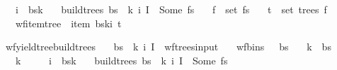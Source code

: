 \begin{isabellebody}
\ \ \ {\isachardoublequoteopen}i\ {\isacharless}{\kern0pt}\ {\isacharbar}{\kern0pt}bs{\isacharbang}{\kern0pt}k{\isacharbar}{\kern0pt}{\isachardoublequoteclose}\isanewline
\ \ \ {\isachardoublequoteopen}build{\isacharunderscore}{\kern0pt}trees{\isacharprime}{\kern0pt}\ bs\ {\isasymomega}\ k\ i\ I\ {\isacharequal}{\kern0pt}\ Some\ fs{\isachardoublequoteclose}\isanewline
\ \ \ {\isachardoublequoteopen}f\ {\isasymin}\ set\ fs{\isachardoublequoteclose}\isanewline
\ \ \ {\isachardoublequoteopen}t\ {\isasymin}\ set\ {\isacharparenleft}{\kern0pt}trees\ f{\isacharparenright}{\kern0pt}{\isachardoublequoteclose}\isanewline
\ \ \ {\isachardoublequoteopen}wf{\isacharunderscore}{\kern0pt}item{\isacharunderscore}{\kern0pt}tree\ {\isasymG}\ {\isacharparenleft}{\kern0pt}item\ {\isacharparenleft}{\kern0pt}bs{\isacharbang}{\kern0pt}k{\isacharbang}{\kern0pt}i{\isacharparenright}{\kern0pt}{\isacharparenright}{\kern0pt}\ t{\isachardoublequoteclose}%
\isadelimproof
%
\endisadelimproof
%
\isatagproof
%
\endisatagproof
{\isafoldproof}%
%
\isadelimproof
%
\endisadelimproof
%
\begin{isamarkuptext}%
%
\end{isamarkuptext}\isamarkuptrue%
\isamarkupfalse%
\ wf{\isacharunderscore}{\kern0pt}yield{\isacharunderscore}{\kern0pt}tree{\isacharunderscore}{\kern0pt}build{\isacharunderscore}{\kern0pt}trees{\isacharprime}{\kern0pt}{\isacharcolon}{\kern0pt}\isanewline
\ \ \ {\isachardoublequoteopen}{\isacharparenleft}{\kern0pt}bs{\isacharcomma}{\kern0pt}\ {\isasymomega}{\isacharcomma}{\kern0pt}\ k{\isacharcomma}{\kern0pt}\ i{\isacharcomma}{\kern0pt}\ I{\isacharparenright}{\kern0pt}\ {\isasymin}\ wf{\isacharunderscore}{\kern0pt}trees{\isacharunderscore}{\kern0pt}input{\isachardoublequoteclose}\isanewline
\ \ \ {\isachardoublequoteopen}wf{\isacharunderscore}{\kern0pt}bins\ {\isasymG}\ {\isasymomega}\ bs{\isachardoublequoteclose}\isanewline
\ \ \ {\isachardoublequoteopen}k\ {\isacharless}{\kern0pt}\ {\isacharbar}{\kern0pt}bs{\isacharbar}{\kern0pt}{\isachardoublequoteclose}\isanewline
\ \ \ {\isachardoublequoteopen}k\ {\isasymle}\ {\isacharbar}{\kern0pt}{\isasymomega}{\isacharbar}{\kern0pt}{\isachardoublequoteclose}\isanewline
\ \ \ {\isachardoublequoteopen}i\ {\isacharless}{\kern0pt}\ {\isacharbar}{\kern0pt}bs{\isacharbang}{\kern0pt}k{\isacharbar}{\kern0pt}{\isachardoublequoteclose}\isanewline
\ \ \ {\isachardoublequoteopen}build{\isacharunderscore}{\kern0pt}trees{\isacharprime}{\kern0pt}\ bs\ {\isasymomega}\ k\ i\ I\ {\isacharequal}{\kern0pt}\ Some\ fs{\isachardoublequoteclose}\isanewline

\end{isabellebody}
